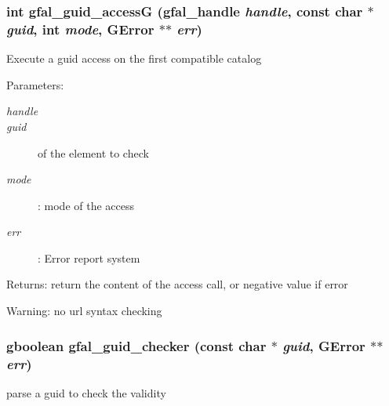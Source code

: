 \subsubsection{\setlength{\rightskip}{0pt plus 5cm}int gfal\_\-guid\_\-access\-G (gfal\_\-handle {\em handle}, const char $\ast$ {\em guid}, int {\em mode}, GError $\ast$$\ast$ {\em err})}\label{gfal__common__guid_8h_55770e13f0626b60b830e3254df7ee9d}


Execute a guid access on the first compatible catalog \begin{Desc}
\item[Parameters:]
\begin{description}
\item[{\em handle}]\item[{\em guid}]of the element to check \item[{\em mode}]: mode of the access \item[{\em err}]: Error report system \end{description}
\end{Desc}
\begin{Desc}
\item[Returns:]return the content of the access call, or negative value if error \end{Desc}
\begin{Desc}
\item[Warning:]no url syntax checking \end{Desc}
\subsubsection{\setlength{\rightskip}{0pt plus 5cm}gboolean gfal\_\-guid\_\-checker (const char $\ast$ {\em guid}, GError $\ast$$\ast$ {\em err})}\label{gfal__common__guid_8h_9e4b6149b0256f725bc1dab5fc32ab62}


parse a guid to check the validity 
